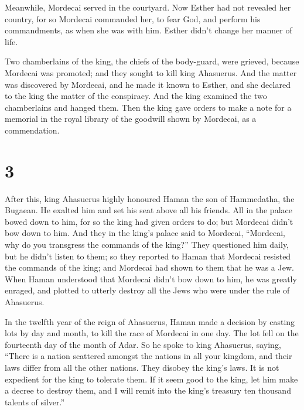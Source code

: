  Meanwhile, Mordecai served in the courtyard. 
Now Esther had not revealed her country, for so Mordecai commanded her,
to fear God, and perform his commandments, as when she was with him.
Esther didn't change her manner of life.

 Two chamberlains of the king, the chiefs of the
body-guard, were grieved, because Mordecai was promoted; and they sought
to kill king Ahasuerus.  And the matter was discovered by
Mordecai, and he made it known to Esther, and she declared to the king
the matter of the conspiracy.  And the king examined the
two chamberlains and hanged them. Then the king gave orders to make a
note for a memorial in the royal library of the goodwill shown by
Mordecai, as a commendation.

\hypertarget{section-2}{%
\section{3}\label{section-2}}

 After this, king Ahasuerus highly honoured Haman the son of
Hammedatha, the Bugaean. He exalted him and set his seat above all his
friends.  All in the palace bowed down to him, for so the
king had given orders to do; but Mordecai didn't bow down to him.
 And they in the king's palace said to Mordecai, ``Mordecai,
why do you transgress the commands of the king?''  They
questioned him daily, but he didn't listen to them; so they reported to
Haman that Mordecai resisted the commands of the king; and Mordecai had
shown to them that he was a Jew.  When Haman understood that
Mordecai didn't bow down to him, he was greatly enraged, 
and plotted to utterly destroy all the Jews who were under the rule of
Ahasuerus.

 In the twelfth year of the reign of Ahasuerus, Haman made a
decision by casting lots by day and month, to kill the race of Mordecai
in one day. The lot fell on the fourteenth day of the month of Adar.
 So he spoke to king Ahasuerus, saying, ``There is a nation
scattered amongst the nations in all your kingdom, and their laws differ
from all the other nations. They disobey the king's laws. It is not
expedient for the king to tolerate them.  If it seem good to
the king, let him make a decree to destroy them, and I will remit into
the king's treasury ten thousand talents of silver.''

